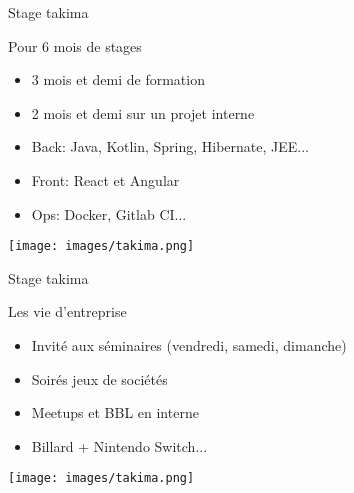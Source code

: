 \begin{frame}{Stage takima}

  \begin{block}{Pour 6 mois de stages}
    \begin{itemize}
      \item 3 mois et demi de formation
      \item 2 mois et demi sur un projet interne
      \item Back: Java, Kotlin, Spring, Hibernate, JEE...
      \item Front: React et Angular
      \item Ops: Docker, Gitlab CI...
    \end{itemize}
    \centering
    \begin{minipage}{0.33\paperwidth}
      \texttt{[image: images/takima.png]}
    \end{minipage}
  \end{block}
  
  \end{frame}
  
  \begin{frame}{Stage takima}
  
  \begin{exampleblock}{Les vie d'entreprise}
    \begin{itemize}
      \item Invité aux séminaires (vendredi, samedi, dimanche)
      \item Soirés jeux de sociétés
      \item Meetups et BBL en interne
      \item Billard + Nintendo Switch...
    \end{itemize}
    \centering
    \begin{minipage}{0.33\paperwidth}
      \texttt{[image: images/takima.png]}
    \end{minipage}
  \end{exampleblock}
  
  \end{frame}
